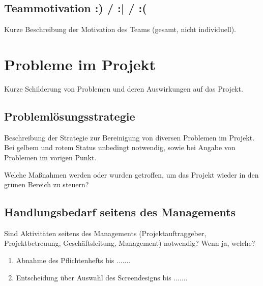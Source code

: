 \documentclass[
	headings=optiontotocandhead,%
	oneside,
	numbers=noenddot,%
	toc=flat, %
	10pt, %
	parskip=full, %
	listof=totoc, %
	listof=flat, %
	numbers=noenddot, %
	bibliography=totoc, %
	a4paper,DIV=14,
]{scrartcl}
\begin{document}
\subsection{Teammotivation \colorbox{green!30}{:)} / \colorbox{yellow!30}{:|} / \colorbox{red!30}{:(}} %
Kurze Beschreibung der Motivation des Teams (gesamt, nicht individuell).

\section{Probleme im Projekt}
Kurze Schilderung von Problemen und deren Auswirkungen auf das Projekt.

\subsection{Problemlösungsstrategie}
Beschreibung der Strategie zur Bereinigung von diversen Problemen im Projekt. Bei gelbem und rotem Status unbedingt notwendig, sowie bei Angabe von Problemen im vorigen Punkt.

Welche Maßnahmen werden oder wurden getroffen, um das Projekt wieder in den grünen Bereich zu steuern?

\subsection{Handlungsbedarf seitens des Managements}
Sind Aktivitäten seitens des Managements (Projektauftraggeber, Projektbetreuung, Geschäftsleitung, Management) notwendig? Wenn ja, welche?

\begin{enumerate}
	\item Abnahme des Pflichtenhefts bis .......
	\item Entscheidung über Auswahl des Screendesigns bis .......
\end{enumerate}
\end{document}
